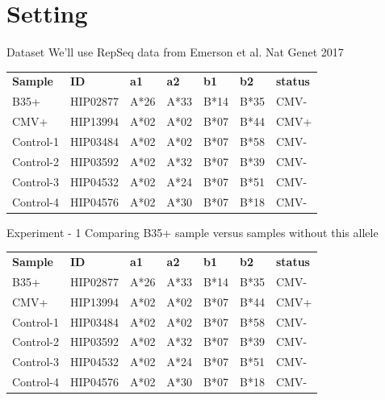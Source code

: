 \documentclass[12pt]{beamer}
\begin{document}
\section{Setting}

\begin{frame}{Dataset}
We'll use RepSeq data from Emerson et al. Nat Genet 2017
\begin{table}[]
\begin{tabular}{lllllll}
\textbf{Sample} & \textbf{ID} & \textbf{a1} & \textbf{a2} & \textbf{b1} & \textbf{b2} & \textbf{status} \\
B35+            & HIP02877    & A*26        & A*33        & B*14        & B*35        & CMV-            \\
CMV+            & HIP13994    & A*02        & A*02        & B*07        & B*44        & CMV+            \\
Control-1       & HIP03484    & A*02        & A*02        & B*07        & B*58        & CMV-            \\
Control-2       & HIP03592    & A*02        & A*32        & B*07        & B*39        & CMV-            \\
Control-3       & HIP04532    & A*02        & A*24        & B*07        & B*51        & CMV-            \\
Control-4       & HIP04576    & A*02        & A*30        & B*07        & B*18        & CMV-           
\end{tabular}
\end{table}
\end{frame}

\begin{frame}{Experiment - 1}
Comparing B35+ sample versus samples without this allele
\begin{table}[]
\begin{tabular}{lllllll}
\textbf{Sample} & \textbf{ID} & \textbf{a1} & \textbf{a2} & \textbf{b1}                  & \textbf{b2}                  & \textbf{status} \\
B35+            & HIP02877    & A*26        & A*33        & B*14                         & \cellcolor[HTML]{FFC702}B*35 & CMV-            \\
CMV+            & HIP13994    & A*02        & A*02        & B*07                         & B*44                         & CMV+            \\
Control-1       & HIP03484    & A*02        & A*02        & \cellcolor[HTML]{9698ED}B*07 & \cellcolor[HTML]{9698ED}B*58 & CMV-            \\
Control-2       & HIP03592    & A*02        & A*32        & \cellcolor[HTML]{9698ED}B*07 & \cellcolor[HTML]{9698ED}B*39 & CMV-            \\
Control-3       & HIP04532    & A*02        & A*24        & \cellcolor[HTML]{9698ED}B*07 & \cellcolor[HTML]{9698ED}B*51 & CMV-            \\
Control-4       & HIP04576    & A*02        & A*30        & \cellcolor[HTML]{9698ED}B*07 & \cellcolor[HTML]{9698ED}B*18 & CMV-           
\end{tabular}
\end{table}
\end{frame}
\end{document}
